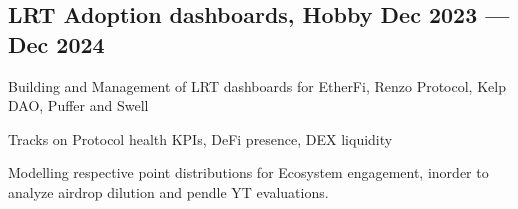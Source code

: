 \subsection*{ {\color{UI_blue} LRT Adoption dashboards}, {\normalsize\normalfont Hobby} \hfill Dec 2023 --- Dec 2024} 
    \begin{zitemize}
        \item Building and Management of LRT dashboards for EtherFi, Renzo Protocol, Kelp DAO, Puffer and Swell 
        \item Tracks  on Protocol health KPIs, DeFi presence, DEX liquidity
        \item Modelling respective point distributions for Ecosystem engagement, inorder to analyze airdrop dilution and pendle YT evaluations.
    \end{zitemize}




